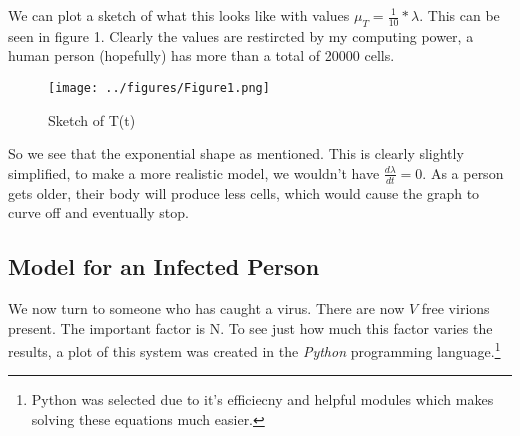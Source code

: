 We can plot a sketch of what this looks like with values $\mu_T = \frac{1}{10}* \lambda$. This can be seen in figure 1. Clearly the values are restircted by my computing power, a human person (hopefully) has more than a total of 20000 cells.

\begin{figure}[t]
    \centering
    \texttt{[image: ../figures/Figure1.png]}
    \caption{Sketch of T(t)}
\end{figure}

\newpage

So we see that the exponential shape as mentioned. This is clearly slightly simplified, to make a more realistic model, we wouldn't have $\frac{d \lambda}{dt} = 0$. As a person gets older, their body will produce less cells, which would cause the graph to curve off and eventually stop. 

\subsection{Model for an Infected Person}
We now turn to someone who has caught a virus. There are now $V$ free virions present. The important factor is N. To see just how much this factor varies the results, a plot of this system was created in the \textit{Python} programming language.\footnote{Python was selected due to it's efficiecny and helpful modules which makes solving these equations much easier.}
{}

